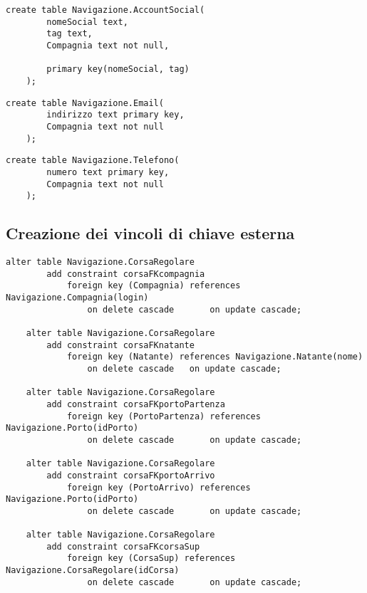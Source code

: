 \begin{lstlisting}[style=sqlstyle, title = {Creazione della tabella AccountSocial}]
    create table Navigazione.AccountSocial(
        nomeSocial text,
        tag text,
        Compagnia text not null,
    
        primary key(nomeSocial, tag)
    );
\end{lstlisting}

\begin{lstlisting}[style=sqlstyle, title = {Creazione della tabella Email}]
    create table Navigazione.Email(
        indirizzo text primary key,
        Compagnia text not null
    );
\end{lstlisting}

\begin{lstlisting}[style=sqlstyle, title = {Creazione della tabella Telefono}]
    create table Navigazione.Telefono(
        numero text primary key,
        Compagnia text not null
    );
\end{lstlisting}

\subsection{Creazione dei vincoli di chiave esterna}
\begin{lstlisting}[style=sqlstyle, title = {Aggiunti vincoli di chiave esterna per la tabella CorsaRegolare}]
    alter table Navigazione.CorsaRegolare
        add constraint corsaFKcompagnia 
            foreign key (Compagnia) references Navigazione.Compagnia(login)
                on delete cascade       on update cascade;
    
    alter table Navigazione.CorsaRegolare
        add constraint corsaFKnatante
            foreign key (Natante) references Navigazione.Natante(nome)
                on delete cascade   on update cascade;
    
    alter table Navigazione.CorsaRegolare
        add constraint corsaFKportoPartenza
            foreign key (PortoPartenza) references Navigazione.Porto(idPorto)
                on delete cascade       on update cascade;
    
    alter table Navigazione.CorsaRegolare
        add constraint corsaFKportoArrivo
            foreign key (PortoArrivo) references Navigazione.Porto(idPorto)
                on delete cascade       on update cascade;
    
    alter table Navigazione.CorsaRegolare
        add constraint corsaFKcorsaSup
            foreign key (CorsaSup) references Navigazione.CorsaRegolare(idCorsa)
                on delete cascade       on update cascade;
\end{lstlisting}

